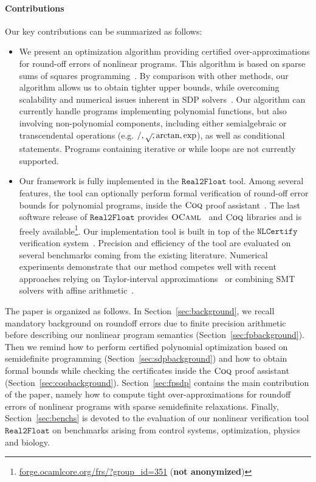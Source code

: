 \documentclass[preprint,fleqn,nocopyrightspace]{sigplanconf}
\newcommand{\realtofloat}{\mathtt{Real2Float}}
\newcommand{\coq}{\text{\sc Coq}}
\newcommand{\ocaml}{\text{\sc OCaml}}
\newcommand{\nlcertify}{\mathtt{NLCertify}}
\theoremstyle{plain}
\begin{document}
\paragraph{Contributions}
%
Our key contributions can be summarized as follows:
\begin{itemize}[noitemsep,nolistsep]
\item We present an optimization algorithm providing certified over-approximations for round-off errors of nonlinear programs. This algorithm is based on sparse sums of squares programming~\cite{Las06SparseSOS}. By comparison with other methods, our algorithm allows us to obtain tighter upper bounds, while overcoming scalability and numerical issues inherent in SDP solvers~\cite{Todd01semidefiniteoptimization}. Our algorithm can currently handle  programs implementing polynomial functions, but also involving non-polynomial components, including either semialgebraic or transcendental operations (e.g. $/, \sqrtsign, \arctan, \exp$), as well as conditional statements.  Programs containing iterative or while loops are not currently supported.
\item Our framework is fully implemented in the $\realtofloat$ tool.  Among several features, the tool can optionally perform formal verification of round-off error bounds for polynomial programs, inside the $\coq$ proof assistant~\cite{CoqProofAssistant}. The last software release of $\realtofloat$ provides $\ocaml$~\cite{OCaml} and $\coq$ libraries and is freely available\footnote{\url{forge.ocamlcore.org/frs/?group_id=351} (\textbf{not anonymized})}.
%
%
Our implementation tool is built in top of the $\nlcertify$ verification system~\cite{icms14}. Precision and efficiency of the tool are evaluated on several benchmarks coming from the existing literature. Numerical experiments demonstrate that our method competes well with recent approaches relying on Taylor-interval approximations~\cite{fptaylor15} or combining SMT solvers with affine arithmetic~\cite{Darulova14Popl}.
\end{itemize}
%


The paper is organized as follows.
%
In Section~\ref{sec:background}, we recall mandatory background on roundoff errors due to finite precision arithmetic before describing our nonlinear program semantics (Section~\ref{sec:fpbackground}). Then we remind how to perform certified polynomial optimization based on semidefinite programming (Section~\ref{sec:sdpbackground}) and how to obtain formal bounds while checking the certificates inside the $\coq$ proof assistant (Section~\ref{sec:coqbackground}).
%
Section~\ref{sec:fpsdp} contains the main contribution of the paper, namely how to compute tight over-approximations for roundoff errors of nonlinear programs with sparse semidefinite relaxations.
%
Finally, Section~\ref{sec:benchs} is devoted to the evaluation of our nonlinear verification tool $\realtofloat$ on benchmarks arising from control systems, optimization, physics and biology.
\end{document}
